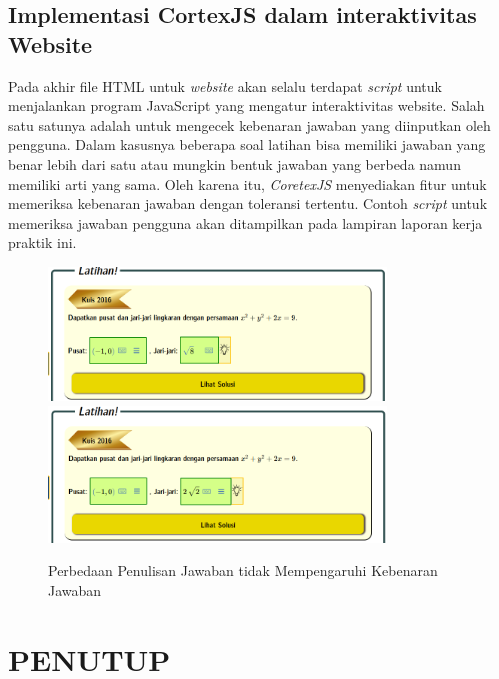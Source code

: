 \documentclass{file/KP-ITS}
\theoremstyle{definition}
\theoremstyle{definition}
\theoremstyle{plain}
\begin{document}
\section{Implementasi CortexJS dalam interaktivitas Website}
Pada akhir file HTML untuk \textit{website} akan selalu terdapat \textit{script} untuk menjalankan program JavaScript yang mengatur interaktivitas website. Salah satu satunya adalah untuk mengecek kebenaran jawaban yang diinputkan oleh pengguna. Dalam kasusnya beberapa soal latihan bisa memiliki jawaban yang benar lebih dari satu atau mungkin bentuk jawaban yang berbeda namun memiliki arti yang sama. Oleh karena itu, \textit{CoretexJS} menyediakan fitur untuk memeriksa kebenaran jawaban dengan toleransi tertentu. Contoh \textit{script} untuk memeriksa jawaban pengguna akan ditampilkan pada lampiran laporan kerja praktik ini.

\begin{figure}[h!]
  \centering
  \includegraphics[width=0.8\textwidth]{foto/JawabanBenar1.png}
  \includegraphics[width=0.8\textwidth]{foto/JawabanBenar2.png}
  \caption{Perbedaan Penulisan Jawaban tidak Mempengaruhi Kebenaran Jawaban}
\end{figure}


\chapter{PENUTUP}
\end{document}
